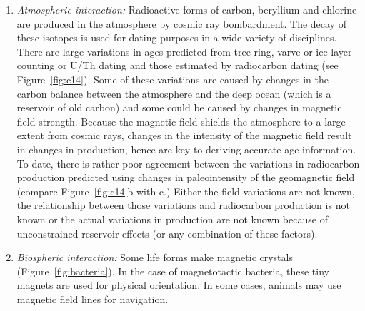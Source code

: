 \begin{enumerate}
\item {\it Atmospheric interaction: }
  Radioactive forms of carbon, beryllium and chlorine are produced in the atmosphere by cosmic ray bombardment.  The decay of these isotopes is used for dating purposes in a wide variety of disciplines.   There are large variations in ages predicted from tree ring, varve or ice layer counting or U/Th dating and those estimated by radiocarbon dating (see Figure~\ref{fig:c14}).  Some of these variations are caused by changes in the carbon balance between the atmosphere and the deep ocean (which is a reservoir of old carbon) and some could be caused by changes in magnetic field strength. Because the magnetic field shields the atmosphere to a large extent from cosmic rays,   changes in the intensity of the magnetic field result in changes in production, hence are
 key to  deriving accurate age information.    To date, there is rather poor agreement between the variations in radiocarbon production predicted using changes in paleointensity of the geomagnetic field (compare Figure~\ref{fig:c14}b with c.)  Either the field variations are not known, the relationship between those variations and radiocarbon production is not known or the actual variations in production are not known because of unconstrained reservoir effects (or any combination of these factors).  



\item {\it Biospheric interaction:}
 Some life forms make magnetic crystals (Figure~\ref{fig:bacteria}).   In the case of magnetotactic bacteria, these tiny magnets are used for physical orientation.  In some cases, animals may use magnetic field lines for navigation.  
 

\end{enumerate}
